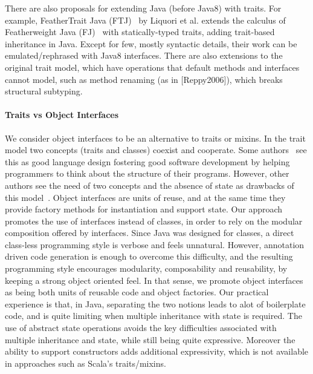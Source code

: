 There are also proposals for extending Java (before Java8) with
traits. For example, FeatherTrait Java (FTJ)~\cite{Liquori08ftj} by
Liquori et al. extends the calculus of Featherweight Java
(FJ)~\cite{Igarashi01FJ} with statically-typed traits, adding
trait-based inheritance in Java.  Except for few, mostly syntactic
details, their work can be emulated/rephrased with Java8 interfaces.
There are also extensions to the original trait model, which have operations 
that default methods and interfaces cannot model, such as method renaming
(as in [Reppy2006]), which breaks structural subtyping.

\paragraph{Traits vs Object Interfaces}
We consider object interfaces to be an alternative to traits or mixins.
In the trait model two concepts (traits and classes) coexist and
cooperate. Some authors~ see this as good language design
fostering good software development by helping programmers to think
about the structure of their programs.  However, other authors see the
need of two concepts and the absence of state as drawbacks of this
model~\cite{malayeri}.  Object interfaces are units of reuse, and at
the same time they provide factory methods for instantiation and
support state.  Our approach promotes the use of interfaces instead of
classes, in order to rely on the modular composition offered
by interfaces. Since Java was designed for classes, a direct class-less
programming style is verbose and feels unnatural. However, annotation
driven code generation is enough to overcome this difficulty, and the
resulting programming style encourages modularity, composability and
reusability, by keeping a strong object oriented feel. In that sense,
we promote object interfaces as being both units of reusable code and
object factories. Our practical experience is that, in Java,
separating the two notions leads to alot of boilerplate code, and is
quite limiting when multiple inheritance with state is required. The
use of abstract state operations avoids the key difficulties
associated with multiple inheritance and state, while still being quite expressive. 
Moreover the ability to support constructors 
adds additional expressivity, which is not available in approaches such 
as Scala's traits/mixins. 


